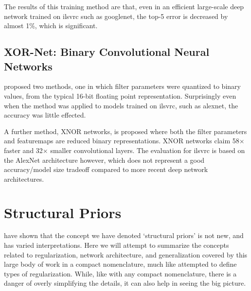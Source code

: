\documentclass[thesis]{subfiles}
\begin{document}
	The results of this training method are that, even in an efficient large-scale deep network trained on \gls{ilsvrc} such as \gls{googlenet}, the top-5 error is decreased by almost 1\%, which is significant.
	
	\subsection{XOR-Net: Binary Convolutional Neural Networks}
	\citet{rastegari2016xnor} proposed two methods, one in which filter parameters were quantized to binary values, from the typical 16-bit floating point representation. Surprisingly even when the method was applied to models trained on \gls{ilsvrc}, such as \gls{alexnet}, the accuracy was little effected.

	A further method, XNOR networks, is proposed where both the filter parameters and \glspl{featuremap} are reduced binary representations. XNOR networks claim 58$\times$ faster and 32$\times$ smaller convolutional layers. The evaluation for \gls{ilsvrc} is based on the AlexNet architecture however, which does not represent a good accuracy/model size tradeoff compared to more recent deep network architectures.
	

\section{Structural Priors}
	 have shown that the concept we have denoted `structural priors' is not new, and has varied interpretations. Here we will attempt to summarize the concepts related to regularization, network architecture, and generalization covered by this large body of work in a compact nomenclature, much like \citet{rethinking2016} attempted to define types of regularization. While, like with any compact nomenclature, there is a danger of overly simplifying the details, it can also help in seeing the big picture.
    
\end{document}
